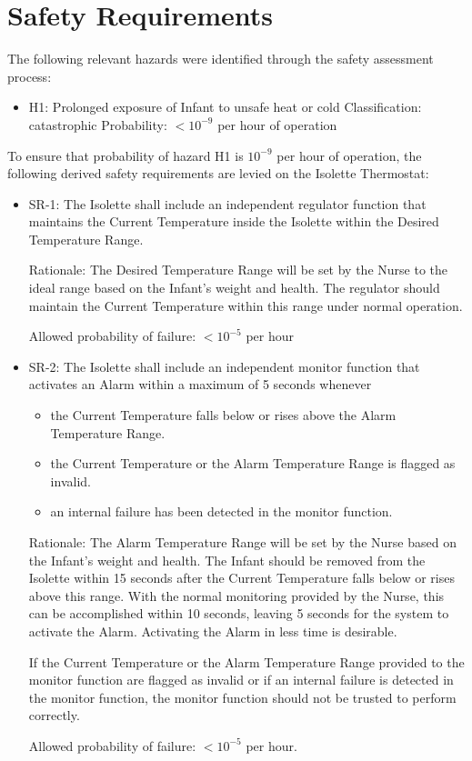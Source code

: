 \chapter{Safety Requirements}
\label{chap:safety-requirements}

The following relevant hazards were identified through the safety assessment process:

\begin{itemize}
\item H1:
      Prolonged exposure of Infant to unsafe heat or cold
      Classification: catastrophic
      Probability: $<10^{-9}$ per hour of operation
\end{itemize}

To ensure that probability of hazard H1 is $10^{-9}$ per hour of operation, the following derived
safety requirements are levied on the Isolette Thermostat:

\begin{itemize}
\item SR-1: The Isolette shall include an independent regulator function that maintains the
      Current Temperature inside the Isolette within the Desired Temperature Range.

      Rationale: The Desired Temperature Range will be set by the Nurse to the ideal range
      based on the Infant’s weight and health. The regulator should maintain the Current
      Temperature within this range under normal operation.

      Allowed probability of failure: $<10^{-5}$ per hour
\item SR-2: The Isolette shall include an independent monitor function that activates an Alarm
      within a maximum of 5 seconds whenever
  \begin{itemize}
  \item the Current Temperature falls below or rises above the Alarm Temperature Range.
  \item the Current Temperature or the Alarm Temperature Range is flagged as invalid.
  \item an internal failure has been detected in the monitor function.
  \end{itemize}
  Rationale: The Alarm Temperature Range will be set by the Nurse based on the Infant’s
  weight and health. The Infant should be removed from the Isolette within 15 seconds
  after the Current Temperature falls below or rises above this range. With the normal
  monitoring provided by the Nurse, this can be accomplished within 10 seconds, leaving 5
  seconds for the system to activate the Alarm. Activating the Alarm in less time is
  desirable.

  If the Current Temperature or the Alarm Temperature Range provided to the monitor
  function are flagged as invalid or if an internal failure is detected in the monitor function,
  the monitor function should not be trusted to perform correctly.

  Allowed probability of failure: $<10^{-5}$ per hour.
\end{itemize}